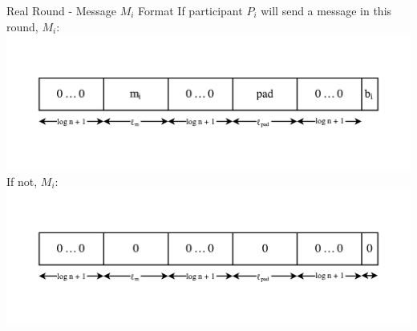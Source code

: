 \begin{frame}{Real Round - Message $M_i$ Format}
    \centering
    If participant $P_i$ will send a message in this round, $M_i$:
    \includegraphics[scale=.55]{images/message-format(1).pdf}\\
    If not, $M_i$:
    \includegraphics[scale=.55]{images/message-format-nomessage.pdf}
\end{frame}